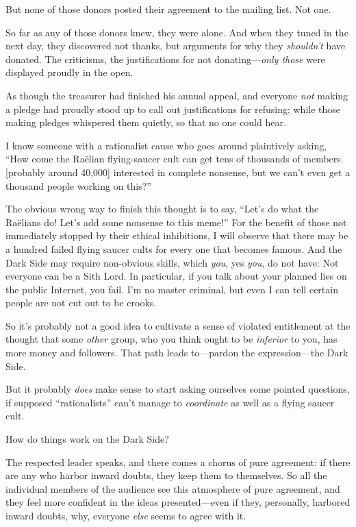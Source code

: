 {
 But none of those donors posted their agreement to the mailing
list. Not one.}

{
 So far as any of those donors knew, they were alone. And when they
tuned in the next day, they discovered not thanks, but arguments for
why they \textit{shouldn't} have donated. The
criticisms, the justifications for not donating---\textit{only those}
were displayed proudly in the open.}

{
 As though the treasurer had finished his annual appeal, and
everyone \textit{not} making a pledge had proudly stood up to call out
justifications for refusing; while those making pledges whispered them
quietly, so that no one could hear.}

{
 I know someone with a rationalist cause who goes around
plaintively asking, ``How come the Raëlian
flying-saucer cult can get tens of thousands of members [probably
around 40,000] interested in complete nonsense, but we
can't even get a thousand people working on
this?''}

{
 The obvious wrong way to finish this thought is to say,
``Let's do what the Raëlians do!
Let's add some nonsense to this
meme!'' For the benefit of those not immediately
stopped by their ethical inhibitions, I will observe that there may be
a hundred failed flying saucer cults for every one that becomes famous.
And the Dark Side may require non-obvious skills, which \textit{you},
yes \textit{you}, do not have: Not everyone can be a Sith Lord. In
particular, if you talk about your planned lies on the public Internet,
you fail. I'm no master criminal, but even I can tell
certain people are not cut out to be crooks.}

{
 So it's probably not a good idea to cultivate a
sense of violated entitlement at the thought that some \textit{other}
group, who you think ought to be \textit{inferior} to you, has more
money and followers. That path leads to---pardon the expression---the
Dark Side.}

{
 But it probably \textit{does} make sense to start asking ourselves
some pointed questions, if supposed
``rationalists''
can't manage to \textit{coordinate} as well as a flying
saucer cult.}

{
 How do things work on the Dark Side?}

{
 The respected leader speaks, and there comes a chorus of pure
agreement: if there are any who harbor inward doubts, they keep them to
themselves. So all the individual members of the audience see this
atmosphere of pure agreement, and they feel more confident in the ideas
presented---even if they, personally, harbored inward doubts, why,
everyone \textit{else} seems to agree with it.}

